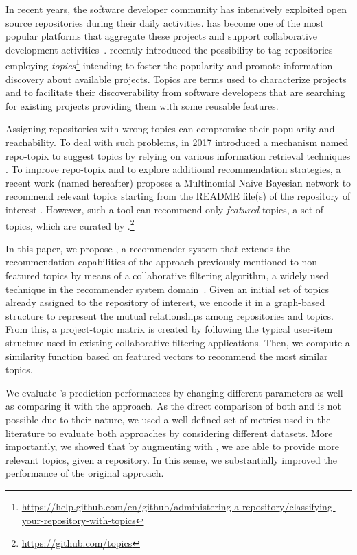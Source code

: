 In recent years, the software developer community has intensively exploited open source 
repositories during their daily activities. \GH has become one of the most
popular platforms that aggregate these projects and support collaborative 
development activities~\cite{7832894}. \GH recently introduced the possibility 
to tag repositories employing 
\emph{topics}\footnote{\url{https://help.github.com/en/github/administering-a-repository/classifying-your-repository-with-topics}}
 intending to foster the popularity and promote information discovery about 
available projects. Topics are terms used to characterize projects and to 
facilitate their discoverability from software developers that are searching 
for existing projects providing them with some reusable features. 

Assigning repositories with wrong topics can compromise their popularity and 
reachability. To deal with such problems, in 2017 \GH introduced a 
mechanism named repo-topix to suggest topics by relying on various information 
retrieval techniques \cite{repo-topix}. To improve repo-topix 
and to explore additional recommendation strategies, a recent work (named \MNB
hereafter) proposes a Multinomial Na\"ive Bayesian network to 
recommend relevant topics starting from the README file(s) of the repository of 
interest \cite{10.1145/3383219.3383227}. However, such a tool can recommend 
only \emph{featured} topics, \ie a set of topics, which are curated by 
\GH.\footnote{\url{https://github.com/topics}}


In this paper, we propose \TF, a recommender system that extends the 
recommendation capabilities of the \MNB approach previously mentioned to 
non-featured topics by means of a collaborative filtering algorithm, a widely used 
technique in the recommender system domain~\cite{Schafer:2007:CFR:1768197.1768208}. Given an initial set of topics already 
assigned to the \GH repository of interest, we encode it in a graph-based 
structure to represent the mutual relationships among repositories and 
topics. From this, a project-topic matrix is created by following the 
typical user-item structure used in existing collaborative filtering applications. Then, we compute a similarity function based on featured vectors 
to recommend the most similar topics.

We evaluate \TF's prediction performances by changing different parameters 
as well as comparing it with the \MNB approach. As the direct comparison of both \MNB and \TF is not 
possible due to their nature, %
we used a well-defined set of metrics used in the literature to evaluate both approaches by 
considering different datasets. More importantly, we showed that by augmenting \MNB with \TF, we are able to provide more relevant topics, given a repository. In this sense, we substantially improved the performance of the original \MNB approach.

